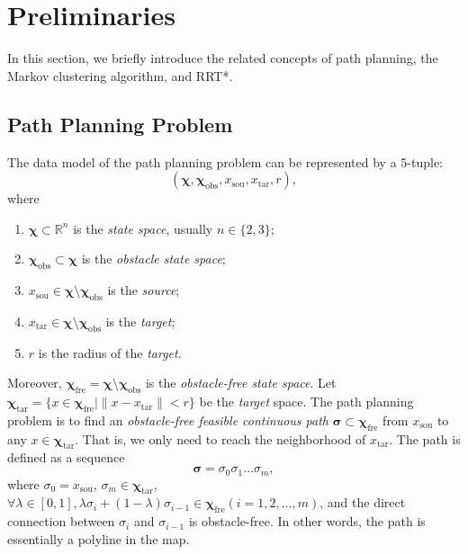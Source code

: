\documentclass[smallcondensed]{svjour3}     %
\begin{document}
\section{Preliminaries}\label{section: Preliminaries}
In this section, we briefly introduce the related concepts of path planning, the Markov clustering algorithm, and RRT*.

\subsection{Path Planning Problem}\label{subsection: path planning problem}
The data model of the path planning problem can be represented by a 5-tuple:
\begin{equation}\label{equation: model}
(\bm{\chi}, \bm{\chi}_{\textrm{obs}}, x_{\textrm{sou}}, x_{\textrm{tar}}, r),
\end{equation}
where
\begin{enumerate}[1)]
	\item $\bm{\chi} \subset \mathbb{R}^n$ is the \emph{state space}, usually $n \in \{2, 3\}$;
	\item $\bm{\chi}_{\textrm{obs}} \subset \bm{\chi}$ is the \emph{obstacle state space};
	\item $x_{\textrm{sou}} \in \bm{\chi} \setminus \bm{\chi}_{\textrm{obs}}$ is the \emph{source};
	\item $x_{\textrm{tar}} \in \bm{\chi} \setminus \bm{\chi}_{\textrm{obs}}$ is the \emph{target};
	\item $r$ is the radius of the \emph{target}.
\end{enumerate}

Moreover, $\bm{\chi}_{\textrm{fre}} = \bm{\chi} \setminus \bm{\chi}_{\textrm{obs}}$ is the \emph{obstacle-free state space}.
Let $\bm{\chi}_{\textrm{tar}} = \{x \in \bm{\chi}_{\textrm{fre}} \vert \lVert x - x_{\textrm{tar}} \rVert < r\}$ be the \emph{target} space.
The path planning problem is to find an \emph{obstacle-free feasible continuous path} $\bm{\sigma} \subset \bm{\chi}_{\textrm{fre}}$ from $x_{\textrm{sou}}$ to any $x \in \bm{\chi}_{\textrm{tar}}$.
That is, we only need to reach the neighborhood of $x_{\textrm{tar}}$.
The path is defined as a sequence
\begin{equation}\label{equation: path}
	\bm{\sigma} = \sigma_0 \sigma_1 \dots \sigma_m,
\end{equation}
where $\sigma_0 = x_{\textrm{sou}}$, $\sigma_m \in \bm{\chi}_{\textrm{tar}}$,
$\forall \lambda \in [0, 1], \lambda \sigma_i + (1 - \lambda)\sigma_{i - 1} \in \bm{\chi}_{\textrm{fre}} (i = 1, 2, \dots, m)$, and
	the direct connection between $\sigma_i$ and $\sigma_{i - 1}$ is obstacle-free.
In other words, the path is essentially a polyline in the map.
\end{document}

